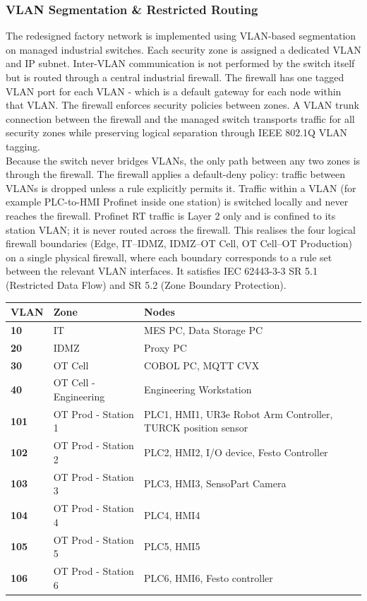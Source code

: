 \documentclass[11pt,a4paper]{article}
\renewcommand{\arraystretch}{1.15}
\begin{document}
\subsubsection{VLAN Segmentation \& Restricted Routing}
The redesigned factory network is implemented using VLAN-based segmentation on
managed industrial switches. Each security zone is assigned a dedicated VLAN
and IP subnet. Inter-VLAN communication is not performed by the switch itself
but is routed through a central industrial firewall. The firewall has one
tagged VLAN port for each VLAN - which is a default gateway for each node
within that VLAN. The firewall enforces security policies between zones. A
VLAN trunk connection between the firewall and the managed switch transports
traffic for all security zones while preserving logical separation through IEEE
802.1Q VLAN tagging. \\ Because the switch never bridges VLANs, the only path
between any two zones is through the firewall. The firewall applies a
default-deny policy: traffic between VLANs is dropped unless a rule explicitly
permits it. Traffic within a VLAN (for example PLC-to-HMI Profinet inside one
station) is switched locally and never reaches the firewall. Profinet RT
traffic is Layer 2 only and is confined to its station VLAN; it is never routed
across the firewall. This realises the four logical firewall boundaries (Edge,
IT–IDMZ, IDMZ–OT Cell, OT Cell–OT Production) on a single physical firewall,
where each boundary corresponds to a rule set between the relevant VLAN
interfaces. It satisfies IEC 62443-3-3 SR 5.1 (Restricted Data Flow) and SR 5.2
(Zone Boundary Protection).

\renewcommand{\arraystretch}{1.3} %
\begin{tabularx}{\textwidth}{>{\bfseries}p{2.5cm} X X}
    VLAN & \textbf{Zone} & \textbf{Nodes} \vspace{0.5em}\\
\toprule
    10 & IT & MES PC, Data Storage PC \\
    20 & IDMZ & Proxy PC\\
    30 & OT Cell & COBOL PC, MQTT CVX \\
    40 & OT Cell - Engineering & Engineering Workstation  \\
    101 & OT Prod - Station 1 & PLC1, HMI1, UR3e Robot Arm Controller, TURCK position sensor \\
    102 & OT Prod - Station 2 & PLC2, HMI2, I/O device, Festo Controller \\
    103 & OT Prod - Station 3 & PLC3, HMI3, SensoPart Camera \\
    104 & OT Prod - Station 4 & PLC4, HMI4 \\
    105 & OT Prod - Station 5 & PLC5, HMI5 \\
    106 & OT Prod - Station 6 & PLC6, HMI6, Festo controller \\
\end{tabularx}
\end{document}

